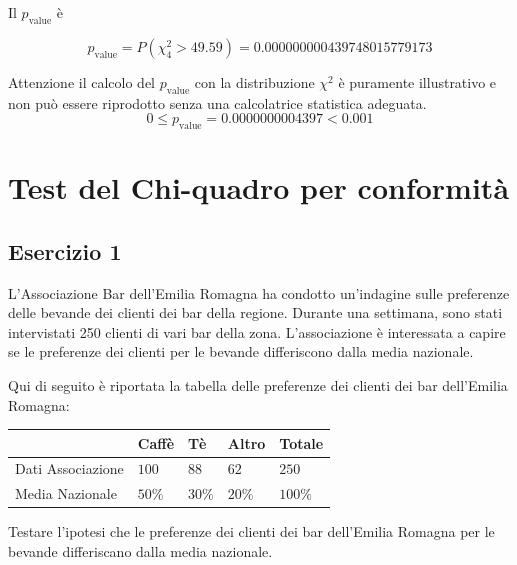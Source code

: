 \documentclass[
  11pt,
]{book}
\theoremstyle{mytheoremstyle}
\theoremstyle{mydefstyle}
\newenvironment{sol}
  {
  \begin{tcolorbox}[enhanced,breakable,arc=0.1mm,boxrule=1pt,colback=white,colframe=iblue,
  title=\bf \fontfamily{lmss}\selectfont \hspace{.5 cm} Soluzione,drop fuzzy shadow]

}{
\end{tcolorbox}
  }
\begin{document}
\begin{sol}
Il \(p_{\text{value}}\) è

\[ p_{\text{value}} = P(\chi^2_{4}>49.59)=0.000000000439748015779173 \]

Attenzione il calcolo del \(p_\text{value}\) con la distribuzione \(\chi^2\) è puramente illustrativo e non può essere riprodotto senza una calcolatrice statistica adeguata.\[
 0 \leq p_\text{value}= 0.0000000004397 < 0.001 
\]

\end{sol}

\chapter{Test del Chi-quadro per conformità}\label{test-del-chi-quadro-per-conformituxe0}

\section{Esercizio 1}\label{esercizio-1-2}

L'Associazione Bar dell'Emilia Romagna ha condotto un'indagine sulle preferenze delle bevande dei clienti dei bar della regione. Durante una settimana, sono stati intervistati 250 clienti di vari bar della zona. L'associazione è interessata a capire se le preferenze dei clienti per le bevande differiscono dalla media nazionale.

Qui di seguito è riportata la tabella delle preferenze dei clienti dei bar dell'Emilia Romagna:

\begin{table}[H]
\centering
\begin{tabular}{lllll}
\toprule
  & Caffè & Tè & Altro & Totale\\
\midrule
Dati Associazione & $100$ & $88$ & $62$ & $250$\\
Media Nazionale & $50\%$ & $30\%$ & $20\%$ & $100\%$\\
\bottomrule
\end{tabular}
\end{table}

Testare l'ipotesi che le preferenze dei clienti dei bar dell'Emilia Romagna per le bevande differiscano dalla media nazionale.
\end{document}
